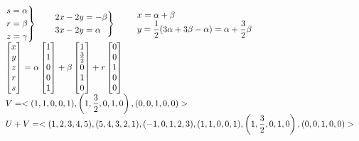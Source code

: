 \begin{enumerate}[label=\color{red}\arabic*), leftmargin=*]
        $\begin{array}{l}
        	\begin{rcases}
        		s=\alpha\\
        		r=\beta\\
        		z=\gamma
        	\end{rcases}\qquad\begin{rcases}
        	2x-2y=-\beta\\
        	3x-2y=\alpha
        	\end{rcases}\qquad\begin{array}{l}
        	x=\alpha+\beta\\
        	y=\dfrac{1}{2}(3\alpha+3\beta-\alpha)=\alpha+\dfrac{3}{2}\beta
        	\end{array}\\
        	\begin{bmatrix}
        		x\\
        		y\\
        		z\\
        		r\\
        		s
        	\end{bmatrix}=\alpha\begin{bmatrix}
        	1\\
        	1\\
        	0\\
        	0\\
        	1
        	\end{bmatrix}+\beta\begin{bmatrix}
        	1\\
        	\frac{3}{2}\\
        	0\\
        	1\\
        	0
        	\end{bmatrix}+r\begin{bmatrix}
        	0\\
        	0\\
        	1\\
        	0\\
        	0
        	\end{bmatrix}\\
        	V=<(1,1,0,0,1),\left(1,\dfrac{3}{2},0,1,0\right),(0,0,1,0,0)>\\
        	U+V=<(1,2,3,4,5),(5,4,3,2,1),(-1,0,1,2,3),(1,1,0,0,1),\left(1,\dfrac{3}{2},0,1,0\right),(0,0,1,0,0)>
        \end{array}$
        

\end{enumerate}
